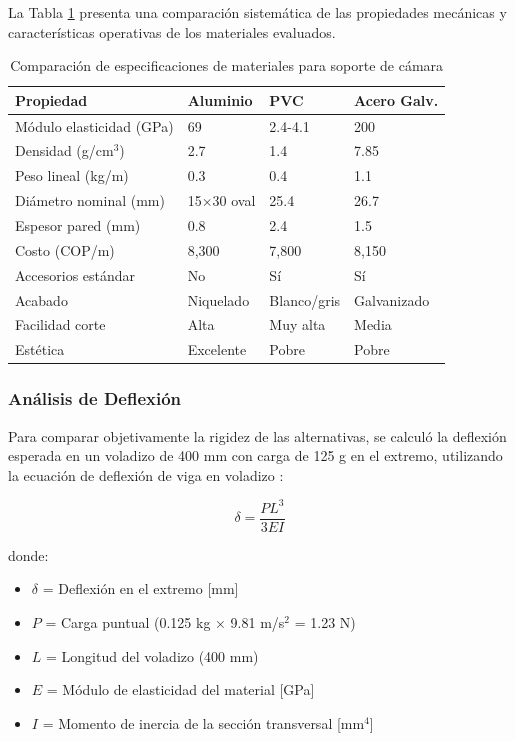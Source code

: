 La Tabla \ref{tab:comparacion_tubos} presenta una comparación sistemática de las propiedades mecánicas y características operativas de los materiales evaluados.

\begin{table}[H]
\centering
\caption{Comparación de especificaciones de materiales para soporte de cámara}
\label{tab:comparacion_tubos}
\small
\begin{tabular}{|l|l|l|l|}
\hline
\textbf{Propiedad} & \textbf{Aluminio} & \textbf{PVC} & \textbf{Acero Galv.} \\
\hline
Módulo elasticidad (GPa) & 69 & 2.4-4.1 & 200 \\
Densidad (g/cm$^3$) & 2.7 & 1.4 & 7.85 \\
Peso lineal (kg/m) & 0.3 & 0.4 & 1.1 \\
Diámetro nominal (mm) & 15×30 oval & 25.4 & 26.7 \\
Espesor pared (mm) & 0.8 & 2.4 & 1.5 \\
Costo (COP/m) & 8,300 & 7,800 & 8,150 \\
Accesorios estándar & No & Sí & Sí \\
Acabado & Niquelado & Blanco/gris & Galvanizado \\
Facilidad corte & Alta & Muy alta & Media \\
Estética & Excelente & Pobre & Pobre \\
\hline
\end{tabular}
\end{table}

\subsubsection{Análisis de Deflexión}

Para comparar objetivamente la rigidez de las alternativas, se calculó la deflexión esperada en un voladizo de 400 mm con carga de 125 g en el extremo, utilizando la ecuación de deflexión de viga en voladizo \cite{Beer2012Mechanics}:

\begin{equation}
\delta = \frac{P L^{3}}{3 E I}
\end{equation}

donde:
\begin{itemize}
    \item $\delta$ = Deflexión en el extremo [mm]
    \item $P$ = Carga puntual (0.125 kg × 9.81 m/s$^2$ = 1.23 N)
    \item $L$ = Longitud del voladizo (400 mm)
    \item $E$ = Módulo de elasticidad del material [GPa]
    \item $I$ = Momento de inercia de la sección transversal [mm$^4$]
\end{itemize}

